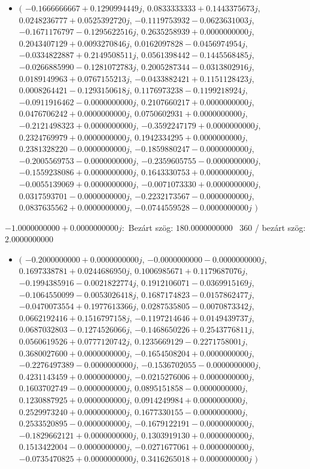\documentclass[14pt,a4paper]{article}
\begin{document}
\begin{itemize}
\item
$\big($
$-0.1666666667+0.1290994449j$, $0.0833333333+0.1443375673j$, $0.0248236777+0.0525392720j$, $-0.1119753932-0.0623631003j$, $-0.1671176797-0.1295622516j$, $0.2635258939+0.0000000000j$, $0.2043407129+0.0093270846j$, $0.0162097828-0.0456974954j$, $-0.0334822887+0.2149508511j$, $0.0561398442-0.1445568485j$, $-0.0266885990-0.1281072783j$, $0.2005287344-0.0313802916j$, $0.0189149963+0.0767155213j$, $-0.0433882421+0.1151128423j$, $0.0008264421-0.1293150618j$, $0.1176973238-0.1199218924j$, $-0.0911916462-0.0000000000j$, $0.2107660217+0.0000000000j$, $0.0476706242+0.0000000000j$, $0.0750602931+0.0000000000j$, $-0.2121498323+0.0000000000j$, $-0.3592247179+0.0000000000j$, $0.2324769979+0.0000000000j$, $0.1942334295+0.0000000000j$, $0.2381328220-0.0000000000j$, $-0.1859880247-0.0000000000j$, $-0.2005569753-0.0000000000j$, $-0.2359605755-0.0000000000j$, $-0.1559238086+0.0000000000j$, $0.1643330753+0.0000000000j$, $-0.0055139069+0.0000000000j$, $-0.0071073330+0.0000000000j$, $0.0317593701-0.0000000000j$, $-0.2232173567-0.0000000000j$, $0.0837635562+0.0000000000j$, $-0.0744559528-0.0000000000j$
$\big)$
\end{itemize}
$-1.0000000000+0.0000000000j$:\
Bezárt szög: $180.0000000000$ \
360 / bezárt szög: $2.0000000000$\
\begin{itemize}
\item
$\big($
$-0.2000000000+0.0000000000j$, $-0.0000000000-0.0000000000j$, $0.1697338781+0.0244686950j$, $0.1006985671+0.1179687076j$, $-0.1994385916-0.0021822774j$, $0.1912106071-0.0369915169j$, $-0.1064550099-0.0053026418j$, $0.1687174823-0.0157862477j$, $-0.0470073554+0.1977613366j$, $0.0287535805-0.0070873342j$, $0.0662192416+0.1516797158j$, $-0.1197214646+0.0149439737j$, $0.0687032803-0.1274526066j$, $-0.1468650226+0.2543776811j$, $0.0560619526+0.0777120742j$, $0.1235669129-0.2271758001j$, $0.3680027600+0.0000000000j$, $-0.1654508204+0.0000000000j$, $-0.2276497389-0.0000000000j$, $-0.1536702055-0.0000000000j$, $0.4231143459+0.0000000000j$, $-0.0215276006+0.0000000000j$, $0.1603702749-0.0000000000j$, $0.0895151858-0.0000000000j$, $0.1230887925+0.0000000000j$, $0.0914249984+0.0000000000j$, $0.2529973240+0.0000000000j$, $0.1677330155-0.0000000000j$, $0.2533520895-0.0000000000j$, $-0.1679122191-0.0000000000j$, $-0.1829662121+0.0000000000j$, $0.1303919130+0.0000000000j$, $0.1513422004-0.0000000000j$, $-0.0271677061+0.0000000000j$, $-0.0735470825+0.0000000000j$, $0.3416265018+0.0000000000j$
$\big)$
\end{itemize}
\end{document}
